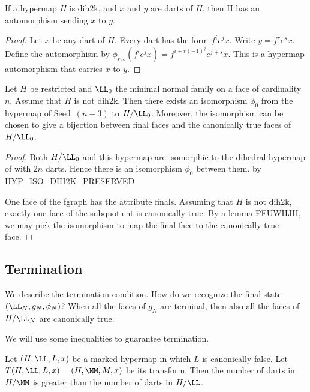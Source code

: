 \begin{lemma} If a hypermap $H$ is dih2k, 
and $x$ and $y$ are darts of $H$, then H has an
  automorphism sending $x$ to $y$.
\end{lemma} 

\begin{proof} Let $x$ be any dart of $H$.  Every dart has the form
  $f^i e^j x$.  Write $y = f^r e^s x$.  Define the automorphism by 
$\phi_{r,s}(f^i e^j x) = f^{i+r (-1)^j}  e^{j+s} x$.  
This is a hypermap automorphism that carries $x$ to $y$.
\end{proof}

\begin{lemma}
Let $H$ be restricted and $\LL_0$ the minimal normal family
on a face of cardinality $n$.  Assume that $H$ is not dih2k.
Then there exists an isomorphism
$\phi_0$ from the hypermap of Seed~$(n-3)$ to $H/\LL_0$.
Moreover, the isomorphism can be chosen to give a bijection 
between final faces and the canonically true faces of $H/\LL_0$.
\end{lemma} 

\begin{proof}
Both $H/\LL_0$ and this hypermap are isomorphic
to the dihedral hypermap of with $2n$ darts.
Hence there is an isomorphism $\phi_0$ between them.
by HYP\_ISO\_DIH2K\_PRESERVED


One face of the fgraph has the attribute finals.  Assuming that $H$ is
not dih2k, exactly one face of the subquotient is canonically true.
By a lemma PFUWHJH, 
we may pick the isomorphism to map the final face
to the canonically true face.
\end{proof}


\subsection{Termination}


We describe the termination condition.  How do we recognize
the final state $(\LL_N,g_N,\phi_N)$?  When all the faces
of $g_N$ are terminal, then also all the faces of $H/\LL_N$ are
canonically true.  

We will use some inequalities to guarantee termination.

\begin{lemma}  
  Let $(H,\LL,L,x)$ be a marked hypermap in which $L$ is canonically
  false.  Let $T(H,\LL,L,x) = (H,\MM,M,x)$ be its transform.  Then the
  number of darts in $H/\MM$ is greater than the number of darts in
  $H/\LL$.
\end{lemma} 

